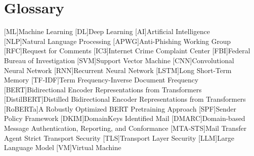 \chapter{Glossary}

\footnotesize
\SingleSpacing

\begin{multicols}{2}
\begin{acronym}[AAAAAA]

	[ML]{Machine Learning}
	[DL]{Deep Learning}
	[AI]{Artificial Intelligence}
	[NLP]{Natural Language Processing}
	[APWG]{Anti-Phishing Working Group}
	[RFC]{Request for Comments}
	[IC3]{Internet Crime Complaint Center}
	[FBI]{Federal Bureau of Investigation}
	[SVM]{Support Vector Machine}
	[CNN]{Convolutional Neural Network}
	[RNN]{Recurrent Neural Network}
	[LSTM]{Long Short-Term Memory}
	[TF-IDF]{Term Frequency-Inverse Document Frequency}
	[BERT]{Bidirectional Encoder Representations from Transformers}
	[DistilBERT]{Distilled Bidirectional Encoder Representations from Transformers}
	[RoBERTa]{A Robustly Optimized BERT Pretraining Approach}
	[SPF]{Sender Policy Framework}
	[DKIM]{DomainKeys Identified Mail}
	[DMARC]{Domain-based Message Authentication, Reporting, and Conformance}
	[MTA-STS]{Mail Transfer Agent Strict Transport Security}
	[TLS]{Transport Layer Security}
	[LLM]{Large Language Model}
	[VM]{Virtual Machine}

\end{acronym}
\end{multicols}

